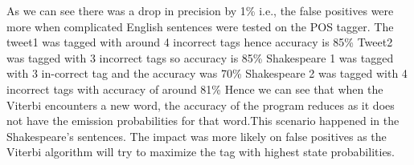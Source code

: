 \documentclass{article}
\begin{document}
\begin{flushleft}
As we can see there was a drop in precision by 1\% i.e., the false positives were more when complicated English sentences were tested on the POS tagger.
The tweet1 was tagged with around 4 incorrect tags hence accuracy is 85\%
Tweet2 was tagged with 3 incorrect tags so accuracy is 85\%
Shakespeare 1 was tagged with 3 in-correct tag and the accuracy was 70\%
Shakespeare 2 was tagged with 4 incorrect tags with accuracy of around 81\%
Hence we can see that when the Viterbi encounters a new word, the accuracy of the program reduces as it does not have the emission probabilities for that word.This scenario happened in the Shakespeare's sentences. The impact was more likely on false positives as the Viterbi algorithm will try to maximize the tag with highest state probabilities. 

\end{flushleft}



\end{document}
